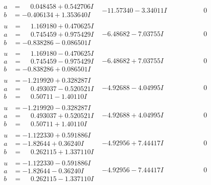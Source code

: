 \documentclass[1p]{elsarticle_modified}
\theoremstyle{definition}
\begin{document}
$$\begin{array}{c|c|c}
\begin{aligned}
a &= \phantom{-}0.048458 + 0.542706 I \\
b &= -0.406134 + 1.353640 I\end{aligned}
 & -11.57340 - 3.34011 I & \phantom{-0.000000 } 0 \\ \hline\begin{aligned}
u &= \phantom{-}1.169180 + 0.470625 I \\
a &= \phantom{-}0.745459 + 0.975429 I \\
b &= -0.838286 - 0.086501 I\end{aligned}
 & -6.48682 - 7.03755 I & \phantom{-0.000000 } 0 \\ \hline\begin{aligned}
u &= \phantom{-}1.169180 - 0.470625 I \\
a &= \phantom{-}0.745459 - 0.975429 I \\
b &= -0.838286 + 0.086501 I\end{aligned}
 & -6.48682 + 7.03755 I & \phantom{-0.000000 } 0 \\ \hline\begin{aligned}
u &= -1.219920 + 0.328287 I \\
a &= \phantom{-}0.493037 - 0.520521 I \\
b &= \phantom{-}0.50711 - 1.40110 I\end{aligned}
 & -4.92688 - 4.04995 I & \phantom{-0.000000 } 0 \\ \hline\begin{aligned}
u &= -1.219920 - 0.328287 I \\
a &= \phantom{-}0.493037 + 0.520521 I \\
b &= \phantom{-}0.50711 + 1.40110 I\end{aligned}
 & -4.92688 + 4.04995 I & \phantom{-0.000000 } 0 \\ \hline\begin{aligned}
u &= -1.122330 + 0.591886 I \\
a &= -1.82644 + 0.36240 I \\
b &= \phantom{-}0.262115 + 1.337110 I\end{aligned}
 & -4.92956 + 7.44417 I & \phantom{-0.000000 } 0 \\ \hline\begin{aligned}
u &= -1.122330 - 0.591886 I \\
a &= -1.82644 - 0.36240 I \\
b &= \phantom{-}0.262115 - 1.337110 I\end{aligned}
 & -4.92956 - 7.44417 I & \phantom{-0.000000 } 0 \\ \hline\begin{aligned}

\end{aligned}
\end{array}$$
\end{document}
